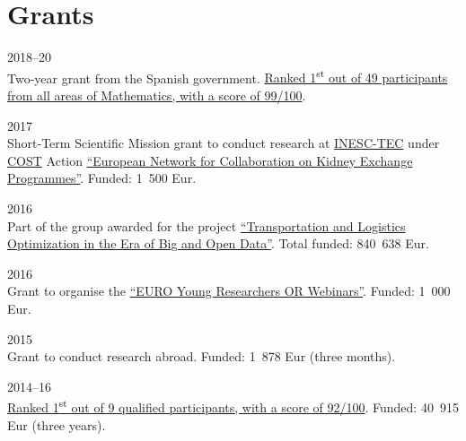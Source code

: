 \section*{Grants}

\begin{paracol}{2}
  \textsc{2018--20}
\switchcolumn
  \\
  Two-year grant from the Spanish government.
  \href{https://santini.in/files/cv/jdc17.pdf}{Ranked 1\textsuperscript{st} out of 49 participants from all areas of Mathematics, with a score of 99/100}.
\end{paracol}

\begin{paracol}{2}
  \textsc{2017}
\switchcolumn
  \\
  Short-Term Scientific Mission grant to conduct research at \href{https://www.inesctec.pt/}{INESC-TEC} under \href{http://www.cost.eu/}{COST} Action \href{http://www.enckep-cost.eu/}{``European Network for Collaboration on Kidney Exchange Programmes''}.
  Funded: 1~500 Eur.
\end{paracol}

\begin{paracol}{2}
  \textsc{2016}
\switchcolumn
  \\
  Part of the group awarded for the project \href{https://santini.in/files/cv/prin16.pdf}{``Transportation and Logistics Optimization in the Era of Big and Open Data''}.
  Total funded: 840~638 Eur.
\end{paracol}

\begin{paracol}{2}
  \textsc{2016}
\switchcolumn
  \\
  Grant to organise the \href{https://www.airoyoung.org/resources/euro-seminars}{``EURO Young Researchers OR Webinars''}.
  Funded: 1~000 Eur.
\end{paracol}

\begin{paracol}{2}
  \textsc{2015}
\switchcolumn
  \\
  Grant to conduct research abroad.
  Funded: 1~878 Eur (three months).
\end{paracol}

\begin{paracol}{2}
  \textsc{2014--16}
\switchcolumn
  \\
  \href{https://santini.in/files/cv/phd14.pdf}{Ranked 1\textsuperscript{st} out of 9 qualified participants, with a score of 92/100}.
  Funded: 40~915 Eur (three years).
\end{paracol}
